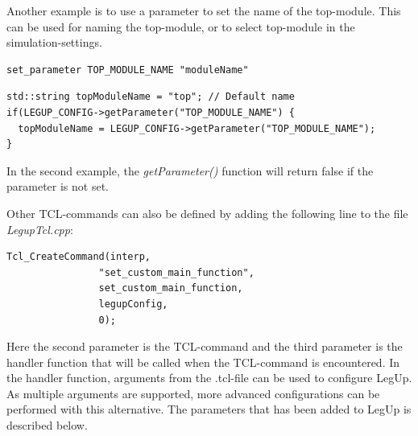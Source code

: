 Another example is to use a parameter to set the name of the top-module. This can be used for naming the top-module, or to select top-module in the simulation-settings. 
\begin{verbatim}
set_parameter TOP_MODULE_NAME "moduleName"
\end{verbatim}
\begin{lstlisting}
std::string topModuleName = "top"; // Default name
if(LEGUP_CONFIG->getParameter("TOP_MODULE_NAME") {
  topModuleName = LEGUP_CONFIG->getParameter("TOP_MODULE_NAME");
}
\end{lstlisting}
In the second example, the \textit{getParameter()} function will return false if the parameter is not set.

Other TCL-commands can also be defined by adding the following line to the file \textit{LegupTcl.cpp}:
\begin{lstlisting}
Tcl_CreateCommand(interp,
                "set_custom_main_function",
                set_custom_main_function,
                legupConfig,
                0);
\end{lstlisting}
Here the second parameter is the TCL-command and the third parameter is the handler function that will be called when the TCL-command is encountered. In the handler function, arguments from the .tcl-file can be used to configure LegUp. As multiple arguments are supported, more advanced configurations can be performed with this alternative. The parameters that has been added to LegUp is described below.

